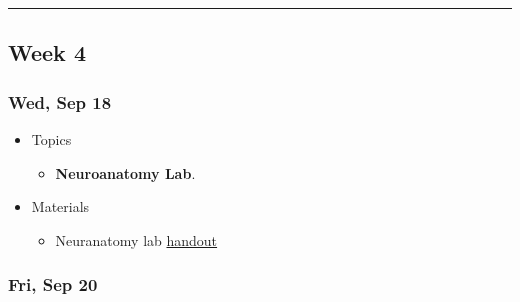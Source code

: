 \documentclass[]{article}
\providecommand{\tightlist}{%
  \setlength{\itemsep}{0pt}\setlength{\parskip}{0pt}}
\begin{document}
\begin{center}\rule{0.5\linewidth}{\linethickness}\end{center}

\hypertarget{week-4}{%
\subsection{Week 4}\label{week-4}}

\hypertarget{wed-sep-18}{%
\subsubsection{Wed, Sep 18}\label{wed-sep-18}}

\begin{itemize}
\tightlist
\item
  Topics

  \begin{itemize}
  \tightlist
  \item
    \textbf{Neuroanatomy Lab}.
  \end{itemize}
\item
  Materials

  \begin{itemize}
  \tightlist
  \item
    Neuranatomy lab
    \href{handouts/neuroanatomy-lab-handout.pdf}{handout}
  \end{itemize}
\end{itemize}

\hypertarget{fri-sep-20}{%
\subsubsection{Fri, Sep 20}\label{fri-sep-20}}
\end{document}
